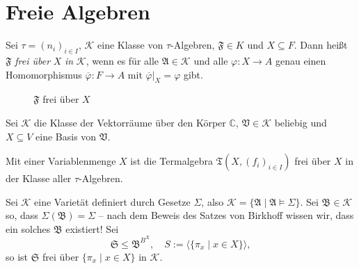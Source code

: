 \section{Freie Algebren}

\begin{definition}
Sei $ \tau = (n_i)_{i \in I}$, $\mathcal{K}$ eine Klasse von $\tau$-Algebren, $\mathfrak{F} \in K$ und $X \subseteq F$. Dann heißt $\mathfrak{F}$ \emph{frei über} $X$ \emph{in} $\mathcal{K}$, wenn es für alle $\mathfrak{A} \in \mathcal{K}$ und alle $\varphi : X \to A$ genau einen Homomorphismus $\overline{\varphi} : F \to A$ mit $\overline{\varphi} \vert_X = \varphi$ gibt.

\begin{figure}[H]
    \centering
    \caption{$\mathfrak{F}$ frei über $X$}
\end{figure}
\end{definition}

\begin{example}
    Sei $\mathcal{K}$ die Klasse der Vektorräume über den Körper $\mathbb{C}$, $\mathfrak{V} \in \mathcal{K}$ beliebig und $X \subseteq V$ eine Basis von $\mathfrak{V}$.

    Mit einer Variablenmenge $X$ ist die Termalgebra $\mathfrak{T}(X, (f_i)_{i \in I})$ frei über $X$ in der Klasse aller $\tau$-Algebren.
\end{example}

\begin{example}
    Sei $\mathcal{K}$ eine Varietät definiert durch Gesetze $\Sigma$, also $\mathcal{K} = \{ \mathfrak{A} \mid \mathfrak{A} \models \Sigma \}$. Sei $\mathfrak{B} \in \mathcal{K}$ so, dass $\Sigma(\mathfrak{B}) = \Sigma$ -- nach dem Beweis des Satzes von Birkhoff wissen wir, dass ein solches $\mathfrak{B}$ existiert! Sei
    $$ \mathfrak{S} \leq \mathfrak{B}^{B^X}, \quad S := \langle \{ \pi_x \mid x \in X \} \rangle, $$
    so ist $\mathfrak{S}$ frei über $\{ \pi_x \mid x \in X \}$ in $\mathcal{K}$.
\end{example}

